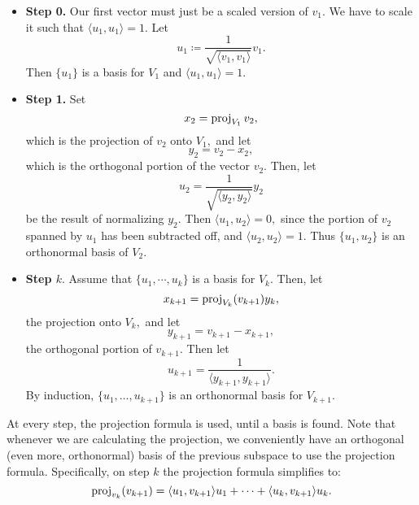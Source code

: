 \begin{itemize}
    \item \textbf{Step 0.} Our first vector must just be a scaled version of $v_1$. We have to scale it such that $\langle u_1, u_1 \rangle = 1$. 
    Let \[u_1 \coloneqq \frac{1}{\sqrt{\langle v_1, v_1 \rangle}}v_1.\] Then $\{u_1\}$ is a basis for $V_1$ and $\langle u_1, u_1 \rangle = 1.$
    
    \item \textbf{Step 1.} Set \[x_2 = \operatorname{proj}_{V_1}v_2,\] which is the projection of $v_2$ onto $V_1,$ and let \[y_2 = v_2 - x_2,\] which is the orthogonal portion of the vector $v_2.$ Then, let 
    \[
    u_2 = \frac{1}{\sqrt{\langle y_2, y_2\rangle}} y_2
    \]
    be the result of normalizing $y_2$. Then $\langle u_1, u_2 \rangle = 0,$ since the portion of $v_2$ spanned by $u_1 $ has been subtracted off, and $\langle u_2, u_2 \rangle = 1.$ Thus $\{u_1, u_2\}$ is an orthonormal basis of $V_2.$
    
    \item \textbf{Step $k.$} Assume that $\{u_1, \cdots, u_k\}$ is a basis for $V_k.$ Then, let 
    \[
    x_{k + 1} = \operatorname{proj}_{V_k}(v_{k + 1})y_k,
    \]
    the projection onto $V_k,$ and let
    \[
    y_{k + 1} = v_{k + 1} - x_{k + 1},
    \]
    the orthogonal portion of $v_{k +1}.$ Then let 
    \[
    u_{k + 1} = \frac{1}{\langle y_{k + 1}, y_{k + 1} \rangle}.
    \]
    By induction, $\{u_1, \ldots, u_{k+1} \}$ is an orthonormal basis for $V_{k+1}$.
    
    
    
\end{itemize}
At every step, the projection formula is used, until a basis is found. Note that whenever we are calculating the projection, we conveniently have an orthogonal (even more, orthonormal) basis of the previous subspace to use the projection formula.
Specifically, on step $k$ the projection formula simplifies to: \[ \operatorname{proj}_{v_k} (v_{k+1}) = \langle u_1, v_{k+1} \rangle u_1 + \cdots + \langle u_k, v_{k+1} \rangle u_k.\]

